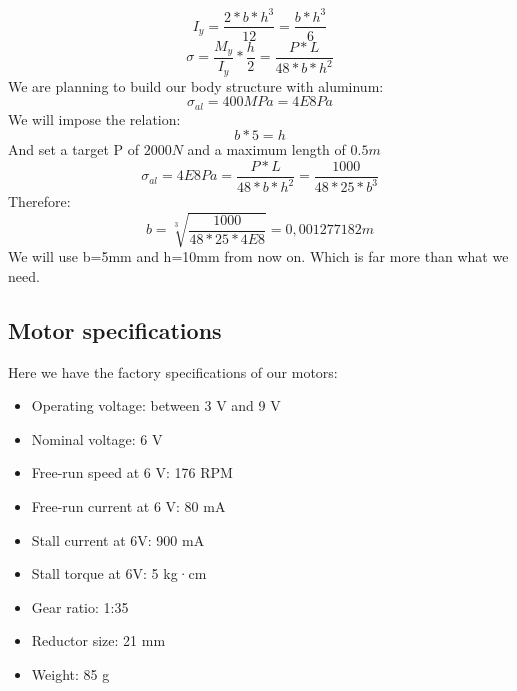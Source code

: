 

\[I_y = \frac{2*b*h^3}{12}=\frac{b*h^3}{6}\]
\[\sigma=\frac{M_y}{I_y}*\frac{h}{2} = \frac{P*L}{48*b*h^2}\]
We are planning to build our body structure with aluminum:
\[\sigma_{al} = 400MPa = 4E8Pa\]
We will impose the relation:
\[b * 5 = h\]
And set a target P of $2000N$ and a maximum length of $0.5m$
\[\sigma_{al} = 4E8Pa = \frac{P*L}{48*b*h^2} = \frac{1000}{48*25*b^3} \]
Therefore:
\[b = \sqrt[3]{\frac{1000}{48*25*4E8}} = 0,001277182 m\]
We will use b=5mm and h=10mm from now on. Which is far more than what we need.

\subsection{Motor specifications}
Here we have the factory specifications of our motors: 
\begin{itemize}
    \item Operating voltage: between 3 V and 9 V
    \item Nominal voltage: 6 V
    \item Free-run speed at 6 V: 176 RPM
    \item Free-run current at 6 V: 80 mA
    \item Stall current at 6V: 900 mA
    \item Stall torque at 6V: 5 kg·cm
    \item Gear ratio: 1:35
    \item Reductor size: 21 mm
    \item Weight: 85 g
\end{itemize}
